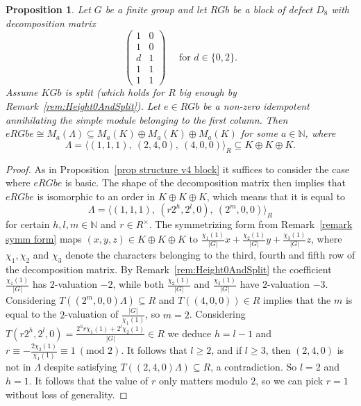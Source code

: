 \documentclass[11pt, a4paper]{amsart}
\newtheorem{proposition}[theorem]{Proposition}
\theoremstyle{definition}
\theoremstyle{definition}
\newcommand{\N}{\mathbb N}
\renewcommand{\geq}{\geqslant}
\begin{document}
\begin{proposition}\label{prop structure block d8}
    Let $G$ be a finite group and let $RGb$ be a block of defect $D_8$ with decomposition matrix 
    \begin{equation}
    \begin{pmatrix} \label{eqn decomp d8}
        1 & 0 \\ 1 & 0 \\ d & 1 \\ 1 & 1 \\ 1 & 1  \end{pmatrix} \quad \textrm{ for $d\in\{0,2\}$}. 
    \end{equation}
    Assume $KGb$ is split (which holds for $R$ big enough by Remark~\ref{rem:Height0AndSplit}). Let $e\in RGb$ be a non-zero idempotent annihilating the simple module belonging to the first column. Then $eRGbe \cong M_a(\Lambda)\subseteq M_a(K)\oplus M_a(K)\oplus M_a(K)$ for some $a\in \N$, where
    \begin{equation}
         \Lambda = \langle (1,1,1),\ (2,4,0),\ (4,0,0) \rangle_R \subseteq K\oplus K \oplus K.
    \end{equation}
\end{proposition}
\begin{proof}
    As in Proposition~\ref{prop structure v4 block} it suffices to consider the case where $eRGbe$ is basic. The shape of the decomposition matrix then implies that $eRGbe$ is isomorphic to an order in $K\oplus K \oplus K$, which means that it is equal to
    \begin{equation}
        \Lambda=\langle (1,1,1),\ (r2^h, 2^l, 0),\ (2^m, 0,0) \rangle_R
    \end{equation}
    for certain $h,l,m\in \N$ and $r\in R^\times$. The symmetrizing form from Remark~\ref{remark symm form}  maps 
    $(x,y,z)\in K \oplus K \oplus K$ to $\frac{\chi_1(1)}{|G|}x+\frac{\chi_2(1)}{|G|}y+\frac{\chi_3(1)}{|G|}z$, where $\chi_1,\chi_2$ and $\chi_3$ denote the characters belonging to the third, fourth and fifth row of the decomposition matrix. By Remark~\ref{rem:Height0AndSplit} the coefficient $\frac{\chi_1(1)}{|G|}$ has $2$-valuation $-2$, while both $\frac{\chi_2(1)}{|G|}$ and $\frac{\chi_3(1)}{|G|}$ have $2$-valuation $-3$. Considering $T((2^m,0,0)\Lambda)\subseteq R$ and $T((4,0,0)) \in R$ implies that the $m$ is equal to the $2$-valuation of $\frac{|G|}{\chi_1(1)}$, so $m=2$. Considering $T(r2^h, 2^l, 0)= \frac{2^hr\chi_1(1)+2^l\chi_2(1)}{|G|}\in R$ we deduce $h=l-1$ and $r\equiv -\frac{2\chi_2(1)}{\chi_1(1)}\equiv 1\ (\textrm{mod }2)$. It follows that $l\geq 2$, and if $l\geq 3$, then $(2,4,0)$ is not in $\Lambda$ despite satisfying $T((2,4,0)\Lambda)\subseteq R$, a contradiction. So $l=2$ and $h=1$. It follows that the value of $r$ only matters modulo $2$, so we can pick $r=1$ without loss of generality.
\end{proof}
\end{document}
